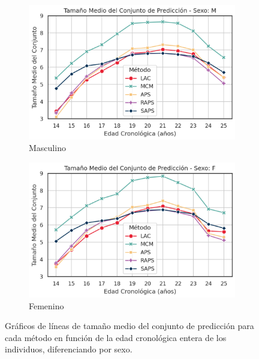 \begin{figure}[h]
    \centering
    
    \begin{subfigure}[b]{0.49\textwidth}
        \centering
        \includegraphics[width=\textwidth]{capitulos/cap_05/imagenes/AGC_MPSS_by_true_age_Male.png}
        \caption{Masculino} 
        \label{fig:AGC_MPSS_by_true_age_M}
    \end{subfigure}
    \hfill
    \begin{subfigure}[b]{0.49\textwidth}
        \centering
        \includegraphics[width=\textwidth]{capitulos/cap_05/imagenes/AGC_MPSS_by_true_age_Female.png}
        \caption{Femenino}
        \label{fig:AGC_MPSS_by_true_age_F}
    \end{subfigure}

    \caption[
        Problema de clasificación de edad: 
        Gráficos de líneas de tamaño medio del conjunto de predicción para cada método en función de la edad cronológica entera de los individuos, diferenciando por sexo.
    ]{
        Gráficos de líneas de tamaño medio del conjunto de predicción para cada método en función de la edad cronológica entera de los individuos, diferenciando por sexo.
    }
    \label{fig:AGC_MPSS_by_true_age}
\end{figure}




